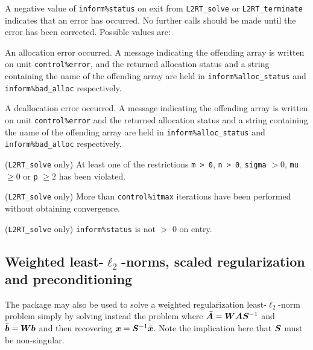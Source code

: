 \documentclass{galahad}
\newcommand{\packagename}{L2\-RT}
\begin{document}

\galerrors
A negative value of  {\tt inform\%status} on exit from
{\tt \packagename\_solve}
or
{\tt \packagename\_terminate}
indicates that an error has occurred. No further calls should be made
until the error has been corrected. Possible values are:

\begin{description}
 An allocation error occurred. A message indicating
the offending
array is written on unit {\tt control\%error}, and the returned allocation
status and a string containing the name of the offending array
are held in {\tt inform\%alloc\_\-status}
and {\tt inform\%bad\_alloc} respectively.

 A deallocation error occurred.
A message indicating the offending
array is written on unit {\tt control\%error} and the returned allocation
status and a string containing the name of the offending array
are held in {\tt inform\%alloc\_\-status}
and {\tt inform\%bad\_alloc} respectively.

 ({\tt \packagename\_solve} only)
At least one of the restrictions
{\tt m > 0},
{\tt n > 0},
{\tt sigma} $> 0$,
{\tt mu} $\geq 0$
or
{\tt p} $\geq 2$
has been violated.

 ({\tt \packagename\_solve} only) More than
{\tt control\%itmax} iterations have been performed without obtaining
convergence.

 ({\tt \packagename\_solve} only)  {\tt inform\%status} is
not $>$ 0 on entry.

\end{description}


\subsection{Weighted least-$\ell_2$-norms, scaled regularization and
preconditioning}
The package may also be used to solve a weighted regularization
least-$\ell_2$-norm problem
simply by solving instead the problem
where $\bar{{\bm{A}}} = {\bm{W}} {\bm{A}} {\bm{S}}^{-1}$ and
$\bar{{\bm{b}}} = {\bm{W}} {\bm{b}}$
and then recovering ${\bm{x}} = {\bm{S}}^{-1} \bar{{\bm{x}}}$. Note the implication here
that ${\bm{S}}$ must be non-singular.
\end{document}
